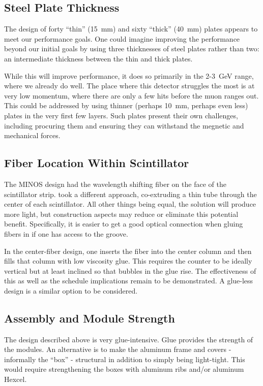 \subsection{Steel Plate Thickness}

The design of forty ``thin'' (15~mm) and sixty ``thick'' (40~mm) plates appears to meet our performance goals. One could imagine improving the performance beyond our initial goals by using three thicknesses of steel plates rather than two: an intermediate thickness between the thin and thick plates.

While this will improve performance, it does so primarily in the 2-3~GeV range, where we already do well. The place where this detector struggles the most is at very low momentum, where there are only a few hits before the muon ranges out. This could be addressed by using thinner (perhaps 10~mm, perhaps even less) plates in the very first few layers. Such plates present their own challenges, including procuring them and ensuring they can withstand the megnetic and mechanical forces.

\subsection{Fiber Location Within Scintillator}

The MINOS design had the wavelength shifting fiber on the face of the scintillator strip.  took a different approach, co-extruding a thin tube through the center of each scintillator. All other things being equal, the  solution will produce more light, but construction aspects may reduce or eliminate this potential benefit. Specifically, it is easier to get a good optical connection when gluing fibers in if one has access to the groove. 

In the center-fiber design, one inserts the fiber into the center column and then fills that column with low viscosity glue. This requires the counter to be ideally vertical but at least inclined so that bubbles in the glue rise. The effectiveness of this as well as the schedule implications remain to be demonstrated. A glue-less design is a similar option to be considered.

\subsection{Assembly and Module Strength}

The design described above is very glue-intensive. Glue provides the strength of the modules. An alternative is to make the aluminum frame and covers - informally the ``box'' - structural in addition to simply being light-tight. This would require strengthening the boxes with aluminum ribs and/or aluminum Hexcel\texttrademark{}.

